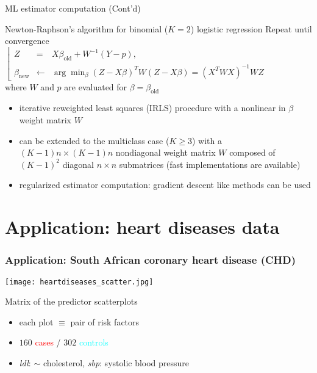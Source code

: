 \documentclass[compress, smaller, serif, 9pt]{beamer}
\newcommand{\structuretext}[1]{{\usebeamercolor[fg]{structure} #1}}
\newcommand{\doigt}{\structuretext{\noindent \Pisymbol{pzd}{43}}}
\begin{document}
\begin{frame}{ML estimator computation (Cont'd)}
 \begin{block}{Newton-Raphson's algorithm for binomial ($K=2$) logistic regression} \medskip
Repeat until convergence\\
$\left\lfloor \begin{array}{rcl}
 Z&=& X  \beta_{\textrm{old}} + W^{-1} (Y-p),\\
\beta_{\textrm{new}}&\leftarrow &\arg \min_{\beta} \left(Z-X\beta\right)^T W \left(Z-X\beta\right)= \left(X^TWX\right)^{-1} W Z
\end{array} \right.$ \medskip \\
where $W$ and $p$ are evaluated for $\beta= \beta_{\textrm{old}}$

\end{block}

\begin{itemize}  
 \item[\doigt] iterative reweighted least squares (IRLS) procedure with a nonlinear in $\beta$ weight matrix $W$
 \item[\doigt] can be extended to the multiclass case ($K\ge 3$) with a $(K-1)n\times(K-1)n$  nondiagonal weight matrix $W$ composed of $(K-1)^2$ diagonal $n\times n$ submatrices (fast implementations are available)
 \item[\doigt] regularized estimator computation: gradient descent like methods can be used
\end{itemize}
 
\end{frame}



\section{Application: heart diseases data}

\begin{frame}
  \frametitle{Application:  South African coronary heart disease (CHD)}
\begin{minipage}{.55\textwidth}
\texttt{[image: heartdiseases\_scatter.jpg]}
\end{minipage}
\hfill
\begin{minipage}{.4\textwidth}
\begin{block}{Matrix of the predictor scatterplots}
\end{block}
\begin{itemize}
   \item each plot $\equiv$ pair of risk factors
   \item $160$ \textcolor{red}{cases} / $302$ \textcolor{cyan}{controls}
   \item {\it ldl}: $\sim$ cholesterol,  {\it sbp}: systolic blood pressure
\end{itemize}
\end{minipage}

\end{frame}
\end{document}
